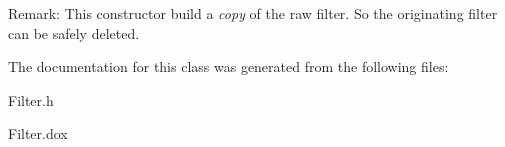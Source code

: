 \begin{DoxyParagraph}{Remark\-:}
This constructor build a {\itshape copy} of the raw filter. So the originating filter can be safely deleted. 
\end{DoxyParagraph}


The documentation for this class was generated from the following files\-:\begin{DoxyCompactItemize}
\item 
Filter.\-h\item 
Filter.\-dox\end{DoxyCompactItemize}
